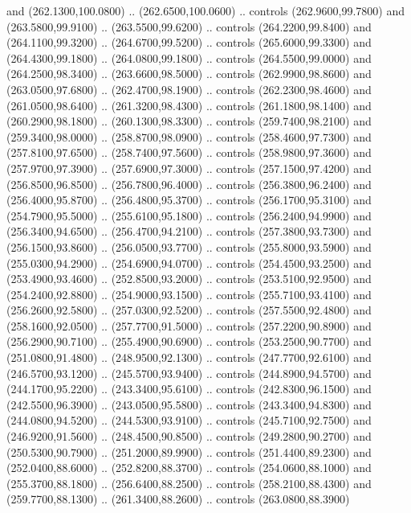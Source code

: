 {\begin{scope}[y=0.80pt, x=0.80pt, yscale=-1, xscale=1, inner sep=0pt, outer sep=0pt, #1]
      and (262.1300,100.0800) .. (262.6500,100.0600) .. controls (262.9600,99.7800)
      and (263.5800,99.9100) .. (263.5500,99.6200) .. controls (264.2200,99.8400)
      and (264.1100,99.3200) .. (264.6700,99.5200) .. controls (265.6000,99.3300)
      and (264.4300,99.1800) .. (264.0800,99.1800) .. controls (264.5500,99.0000)
      and (264.2500,98.3400) .. (263.6600,98.5000) .. controls (262.9900,98.8600)
      and (263.0500,97.6800) .. (262.4700,98.1900) .. controls (262.2300,98.4600)
      and (261.0500,98.6400) .. (261.3200,98.4300) .. controls (261.1800,98.1400)
      and (260.2900,98.1800) .. (260.1300,98.3300) .. controls (259.7400,98.2100)
      and (259.3400,98.0000) .. (258.8700,98.0900) .. controls (258.4600,97.7300)
      and (257.8100,97.6500) .. (258.7400,97.5600) .. controls (258.9800,97.3600)
      and (257.9700,97.3900) .. (257.6900,97.3000) .. controls (257.1500,97.4200)
      and (256.8500,96.8500) .. (256.7800,96.4000) .. controls (256.3800,96.2400)
      and (256.4000,95.8700) .. (256.4800,95.3700) .. controls (256.1700,95.3100)
      and (254.7900,95.5000) .. (255.6100,95.1800) .. controls (256.2400,94.9900)
      and (256.3400,94.6500) .. (256.4700,94.2100) .. controls (257.3800,93.7300)
      and (256.1500,93.8600) .. (256.0500,93.7700) .. controls (255.8000,93.5900)
      and (255.0300,94.2900) .. (254.6900,94.0700) .. controls (254.4500,93.2500)
      and (253.4900,93.4600) .. (252.8500,93.2000) .. controls (253.5100,92.9500)
      and (254.2400,92.8800) .. (254.9000,93.1500) .. controls (255.7100,93.4100)
      and (256.2600,92.5800) .. (257.0300,92.5200) .. controls (257.5500,92.4800)
      and (258.1600,92.0500) .. (257.7700,91.5000) .. controls (257.2200,90.8900)
      and (256.2900,90.7100) .. (255.4900,90.6900) .. controls (253.2500,90.7700)
      and (251.0800,91.4800) .. (248.9500,92.1300) .. controls (247.7700,92.6100)
      and (246.5700,93.1200) .. (245.5700,93.9400) .. controls (244.8900,94.5700)
      and (244.1700,95.2200) .. (243.3400,95.6100) .. controls (242.8300,96.1500)
      and (242.5500,96.3900) .. (243.0500,95.5800) .. controls (243.3400,94.8300)
      and (244.0800,94.5200) .. (244.5300,93.9100) .. controls (245.7100,92.7500)
      and (246.9200,91.5600) .. (248.4500,90.8500) .. controls (249.2800,90.2700)
      and (250.5300,90.7900) .. (251.2000,89.9900) .. controls (251.4400,89.2300)
      and (252.0400,88.6000) .. (252.8200,88.3700) .. controls (254.0600,88.1000)
      and (255.3700,88.1800) .. (256.6400,88.2500) .. controls (258.2100,88.4300)
      and (259.7700,88.1300) .. (261.3400,88.2600) .. controls (263.0800,88.3900)

\end{scope}}
